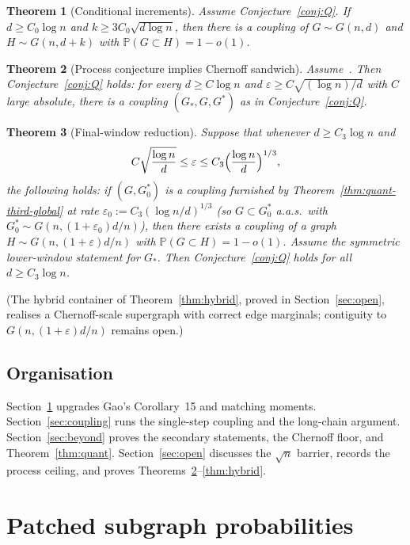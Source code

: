\documentclass[11pt]{article}
\newtheorem{theorem}{Theorem}
\newcommand{\Gnd}{G(n,d)}
\newcommand{\PP}{\mathbb{P}}
\begin{document}
\begin{theorem}[Conditional increments]
\label{thm:Q1}
Assume Conjecture~\ref{conj:Q}.
If \(d\ge C_0\log n\) and \(k\ge 3C_0\sqrt{d\log n}\), then there is a coupling of
\(G\sim\Gnd\) and \(H\sim G(n,d+k)\) with \(\PP(G\subset H)=1-o(1)\).
\end{theorem}

\begin{theorem}[Process conjecture implies Chernoff sandwich]
\label{thm:process-to-Q}
Assume~\cite[Conjecture~1.3]{BIM25}.
Then Conjecture~\ref{conj:Q} holds: for every \(d\ge C\log n\) and
\(\varepsilon\ge C\sqrt{(\log n)/d}\) with \(C\) large absolute, there is a coupling
\((G_*,G,G^*)\) as in Conjecture~\ref{conj:Q}.
\end{theorem}

\begin{theorem}[Final-window reduction]
\label{thm:window}
Suppose that whenever \(d\ge C_3\log n\) and
\[
C\sqrt{\frac{\log n}{d}}
\le\varepsilon
\le C_3\Bigl(\frac{\log n}{d}\Bigr)^{1/3},
\]
the following holds: if \((G,G^*_0)\) is a coupling furnished by
Theorem~\ref{thm:quant-third-global} at rate \(\varepsilon_0:=C_3(\log n/d)^{1/3}\)
(so \(G\subset G^*_0\) a.a.s.\ with \(G^*_0\sim G(n,(1+\varepsilon_0)d/n)\)), then there
exists a coupling of a graph \(H\sim G(n,(1+\varepsilon)d/n)\) with
\(\PP(G\subset H)=1-o(1)\).
Assume the symmetric lower-window statement for \(G_*\).
Then Conjecture~\ref{conj:Q} holds for all \(d\ge C_3\log n\).
\end{theorem}

\noindent
(The hybrid container of Theorem~\ref{thm:hybrid}, proved in
Section~\ref{sec:open}, realises a Chernoff-scale supergraph with correct edge
marginals; contiguity to \(G(n,(1+\varepsilon)d/n)\) remains open.)

\subsection{Organisation}
Section~\ref{sec:patch} upgrades Gao's Corollary~15 and matching moments.
Section~\ref{sec:coupling} runs the single-step coupling and the long-chain argument.
Section~\ref{sec:beyond} proves the secondary statements, the Chernoff floor, and
Theorem~\ref{thm:quant}.
Section~\ref{sec:open} discusses the \(\sqrt{n}\) barrier, records the process
ceiling, and proves Theorems~\ref{thm:process-to-Q}--\ref{thm:hybrid}.

\section{Patched subgraph probabilities}
\label{sec:patch}
\end{document}
